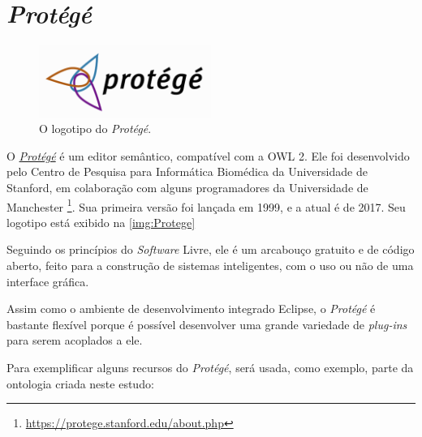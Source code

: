 \section{\textit{Protégé}}

\begin{figure}
	\centering
	\includegraphics[width=0.5\textwidth]{Capitulos/Ferramentas/protege}
	\caption{O logotipo do \textit{Protégé}.}
	\label{img:Protege}
\end{figure}

O \href{https://protege.stanford.edu}{\textit{Protégé}} é um editor semântico, compatível com a OWL 2. Ele foi desenvolvido pelo Centro de Pesquisa para Informática Biomédica da Universidade de Stanford, em colaboração com alguns programadores da Universidade de Manchester \footnote{\url{https://protege.stanford.edu/about.php}}. Sua primeira versão foi lançada em 1999, e a atual é de 2017. Seu logotipo está exibido na \autoref{img:Protege}

Seguindo os princípios do \textit{Software} Livre, ele é um arcabouço gratuito e de código aberto, feito para a construção de sistemas inteligentes, com o uso ou não de uma interface gráfica.

Assim como o ambiente de desenvolvimento integrado Eclipse, o \textit{Protégé} é bastante flexível porque é possível desenvolver uma grande variedade de \textit{plug-ins} para serem acoplados a ele.

Para exemplificar alguns recursos do \textit{Protégé}, será usada, como exemplo, parte da ontologia criada neste estudo:

